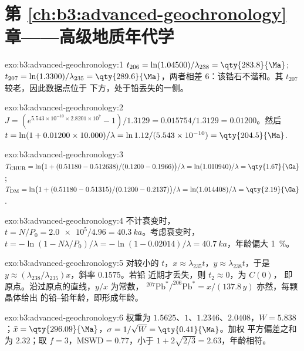 \section*{第 \ref{ch:b3:advanced-geochronology} 章——高级地质年代学}

\begin{solution}{exo:b3:advanced-geochronology:1}
$t_{206} = \ln(1.04500)/\lambda_{238} = \qty{283.8}{\Ma}$; $t_{207} =
\ln(1.3300)/\lambda_{235} = \qty{289.6}{\Ma}$，两者相差
\qty{6}{\Ma}：该锆石不谐和。其 $t_{207}$ 较老，因此数据点位于
下方，处于铅丢失的一侧。
\end{solution}

\begin{solution}{exo:b3:advanced-geochronology:2}
$J = (e^{5.543\times10^{-10}\times2.8201\times10^7} - 1)/1.3129 =
0.015754/1.3129 = 0.01200$。然后 $t = \ln(1 + 0.01200\times10.000)/\lambda =
\ln 1.12/(5.543\times10^{-10}) = \qty{204.5}{\Ma}$.
\end{solution}

\begin{solution}{exo:b3:advanced-geochronology:3}
$T_{\mathrm{CHUR}} = \ln\bigl(1 + (0.51180 - 0.512638)/(0.1200 -
0.1966)\bigr)/\lambda = \ln(1.010940)/\lambda = \qty{1.67}{\Ga}$;
$T_{\mathrm{DM}} = \ln\bigl(1 + (0.51180 - 0.51315)/(0.1200 - 0.2137)\bigr)/\lambda
= \ln(1.014408)/\lambda = \qty{2.19}{\Ga}$.
\end{solution}

\begin{solution}{exo:b3:advanced-geochronology:4}
不计衰变时，$t = N/P_0 = \num{2.0e5}/4.96 = \qty{40.3}{ka}$。考虑衰变时，
$t = -\ln(1 - N\lambda/P_0)/\lambda = -\ln(1 - 0.02014)/\lambda =
\qty{40.7}{ka}$，年龄偏大 \qty{1}{\percent}。
\end{solution}

\begin{solution}{exo:b3:advanced-geochronology:5}
对较小的 $t$，$x \approx \lambda_{235}t$，$y \approx \lambda_{238}t$，于是
$y \approx (\lambda_{238}/\lambda_{235})x$，斜率 $0.1575$。若铅
近期才丢失，则 $t_2 \approx 0$，为 $C(0)$，
即原点。沿过原点的直线，$y/x$ 为常数，
$^{207}\mathrm{Pb}^*/^{206}\mathrm{Pb}^* = x/(137.8\,y)$ 亦然，每颗晶体给出
的铅–铅年龄，即形成年龄。
\end{solution}

\begin{solution}{exo:b3:advanced-geochronology:6}
权重为 $1.5625$、$1$、$1.2346$、$2.0408$，$W = 5.838$；$\bar x =
\qty{296.09}{\Ma}$，$\sigma = 1/\sqrt W = \qty{0.41}{\Ma}$。加权
平方偏差之和为 $2.32$；取 $f = 3$，$\mathrm{MSWD} = 0.77$，小于
$1 + 2\sqrt{2/3} = 2.63$，年龄相符。
\end{solution}

